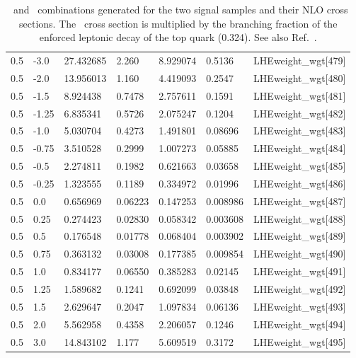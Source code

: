 \begin{table}[!htbp]
\begin{tabular}{lllllll}
   0.5  & -3.0  & 27.432685 & 2.260         & 8.929074  & 0.5136       & LHEweight\_wgt[479]\\
   0.5  & -2.0  & 13.956013 & 1.160         & 4.419093  & 0.2547       & LHEweight\_wgt[480]\\
   0.5  & -1.5  & 8.924438  & 0.7478        & 2.757611  & 0.1591       & LHEweight\_wgt[481]\\
   0.5  & -1.25 & 6.835341  & 0.5726        & 2.075247  & 0.1204       & LHEweight\_wgt[482]\\
   0.5  & -1.0  & 5.030704  & 0.4273        & 1.491801  & 0.08696      & LHEweight\_wgt[483]\\
   0.5  & -0.75 & 3.510528  & 0.2999        & 1.007273  & 0.05885      & LHEweight\_wgt[484]\\
   0.5  & -0.5  & 2.274811  & 0.1982        & 0.621663  & 0.03658      & LHEweight\_wgt[485]\\
   0.5  & -0.25 & 1.323555  & 0.1189        & 0.334972  & 0.01996      & LHEweight\_wgt[486]\\
   0.5  & 0.0   & 0.656969  & 0.06223       & 0.147253  & 0.008986     & LHEweight\_wgt[487]\\
   0.5  & 0.25  & 0.274423  & 0.02830       & 0.058342  & 0.003608     & LHEweight\_wgt[488]\\
   0.5  & 0.5   & 0.176548  & 0.01778       & 0.068404  & 0.003902     & LHEweight\_wgt[489]\\
   0.5  & 0.75  & 0.363132  & 0.03008       & 0.177385  & 0.009854     & LHEweight\_wgt[490]\\
   0.5  & 1.0   & 0.834177  & 0.06550       & 0.385283  & 0.02145      & LHEweight\_wgt[491]\\
   0.5  & 1.25  & 1.589682  & 0.1241        & 0.692099  & 0.03848      & LHEweight\_wgt[492]\\
   0.5  & 1.5   & 2.629647  & 0.2047        & 1.097834  & 0.06136      & LHEweight\_wgt[493]\\
   0.5  & 2.0   & 5.562958  & 0.4358        & 2.206057  & 0.1246       & LHEweight\_wgt[494]\\
   0.5  & 3.0   & 14.843102 & 1.177         & 5.609519  & 0.3172       & LHEweight\_wgt[495]\\ \hline
    \end{tabular} 
    \caption[\CV\ and \Ct\ combinations.]{\CV\ and \Ct\ combinations generated for the two signal samples and their NLO cross sections. The \tHq\ cross section is multiplied by the branching fraction of the enforced leptonic decay of the top quark (0.324). See also Ref.~\cite{THQProdTwiki}.}\label{tab:reweight}
 \end{table}

